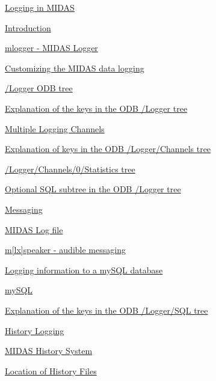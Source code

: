 \begin{TabularC}{2}
\begin{TabularC}{2}
\begin{DoxyItemize}
\item \hyperlink{F_Logging}{Logging in MIDAS} 
\begin{DoxyItemize}
\item \hyperlink{F_Logging_F_Midas_Logger}{Introduction} 
\item \hyperlink{F_Logging_F_mlogger_utility}{mlogger -\/ MIDAS Logger} 
\item \hyperlink{F_Logging_Data}{Customizing the MIDAS data logging} 
\begin{DoxyItemize}
\item \hyperlink{F_Logging_Data_F_Logger_tree}{/Logger ODB tree} 
\item \hyperlink{F_Logging_Data_F_Logger_tree_keys}{Explanation of the keys in the ODB /Logger tree} 
\item \hyperlink{F_Logging_Data_F_Logger_multiple_logging_channels}{Multiple Logging Channels} 
\item \hyperlink{F_Logging_Data_F_Logger_Settings}{Explanation of keys in the ODB /Logger/Channels tree} 
\item \hyperlink{F_Logging_Data_F_Logger_CStat_Statistics}{/Logger/Channels/0/Statistics tree} 
\item \hyperlink{F_Logging_Data_F_Logger_Optional_Keys}{Optional SQL subtree in the ODB /Logger tree} 
\end{DoxyItemize}
\item \hyperlink{F_Messaging}{Messaging} 
\begin{DoxyItemize}
\item \hyperlink{F_Messaging_F_Log_File}{MIDAS Log file} 
\item \hyperlink{F_Messaging_F_mspeaker_utility}{m\mbox{[}lx\mbox{]}speaker -\/ audible messaging} 
\end{DoxyItemize}
\item \hyperlink{F_mySQL}{Logging information to a mySQL database} 
\begin{DoxyItemize}
\item \hyperlink{F_mySQL_F_Logger_mySQL}{mySQL} 
\item \hyperlink{F_mySQL_F_Logger_SQL_keys}{Explanation of the keys in the ODB /Logger/SQL tree} 
\end{DoxyItemize}
\item \hyperlink{F_History_logging}{History Logging} 
\begin{DoxyItemize}
\item \hyperlink{F_History_logging_F_History_System}{MIDAS History System} 
\item \hyperlink{F_History_logging_F_Logger_History_Files_Location}{Location of History Files} 

\end{DoxyItemize}
\end{DoxyItemize}
\end{DoxyItemize}
\end{TabularC}
\end{TabularC}
